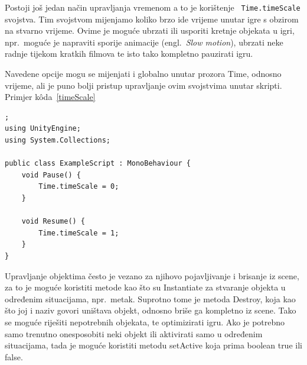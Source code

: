 Postoji još jedan način upravljanja vremenom a to je korištenje \texttt{ Time.timeScale} svojstva. Tim svojstvom mijenjamo koliko brzo ide vrijeme unutar igre s obzirom na stvarno vrijeme. Ovime je moguće ubrzati ili usporiti kretnje objekata u igri, npr.~moguće je napraviti sporije animacije (engl.~\textit{Slow motion}), ubrzati neke radnje tijekom kratkih filmova te isto tako kompletno pauzirati igru.

Navedene opcije mogu se mijenjati i globalno unutar prozora Time, odnosno vrijeme, ali je puno bolji pristup upravljanje ovim svojstvima unutar skripti. Primjer k\^oda~\ref{timeScale}
\begin{lstlisting}[caption={Upravljanje vremenom}, label=timeScale];
using UnityEngine;
using System.Collections;

public class ExampleScript : MonoBehaviour {
    void Pause() {
        Time.timeScale = 0;
    }
    
    void Resume() {
        Time.timeScale = 1;
    }
}
\end{lstlisting}
Upravljanje objektima često je vezano za njihovo pojavljivanje i brisanje iz scene, za to je moguće koristiti metode kao što su Instantiate za stvaranje objekta u određenim situacijama, npr.~metak. Suprotno tome je metoda Destroy, koja kao što joj i naziv govori uništava objekt, odnosno briše ga kompletno iz scene. Tako se moguće riješiti nepotrebnih objekata, te optimizirati igru. Ako je potrebno samo trenutno onesposobiti neki objekt ili aktivirati samo u određenim situacijama, tada je moguće koristiti metodu setActive koja prima boolean true ili false.

